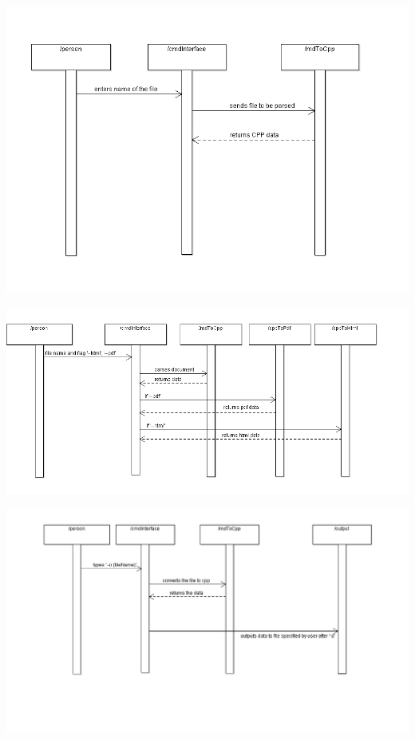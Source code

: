 \hspace{-2cm}\includegraphics[width=500pt]{images/SpecifyingFile.png}

\hspace{-3cm}\includegraphics[width=550pt]{images/SpecifyingOutputFile.png}

\hspace{-3cm}\includegraphics[width=500pt]{images/SpecifyingOutputName.png}
